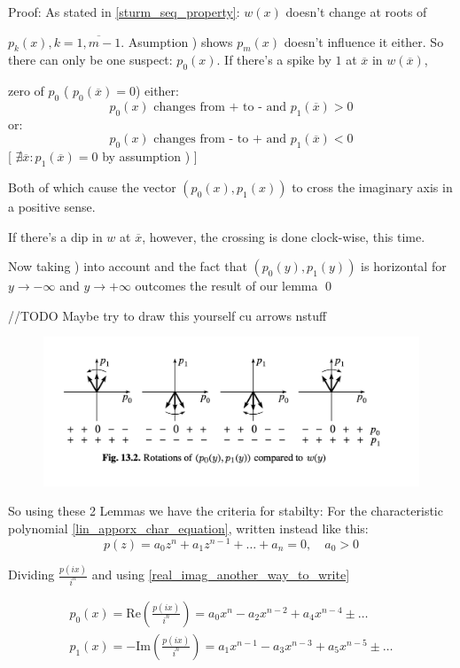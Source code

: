 Proof: As stated in \ref{sturm_seq_property}: $w(x)$ doesn't change at roots of

$p_k(x), k = \overline{1,m-1}$. Asumption ) shows $p_m(x)$
doesn't influence it either. So there can only be one suspect:
$p_0(x)$. If there's a spike by $1$ at $\overline{x}$ in $w(\overline{x})$,

zero of $p_0$
(   $p_0(\overline{x}) =0 $) either:
\[
p_0(x) \text{ changes from + to - and   } p_1(\overline{x}) > 0
\]
or:
\[
p_0(x) \text{ changes from - to + and  } p_1(\overline{x}) < 0
\]
[   $\nexists \overline{x}: p_1(\overline{x}) = 0$ by assumption )  ]

Both of which cause the vector $(p_0(x), p_1(x))$ to cross the
imaginary axis in a positive sense.

If there's a dip in $w$ at $\overline{x}$, however, the crossing is
done clock-wise, this time.

Now taking ) into account and the fact that $(p_0(y), p_1(y))$
is horizontal for $y \rightarrow  - \infty$ and $y \rightarrow +
\infty  $ outcomes the result of our lemma
\qed

//TODO Maybe try to draw this yourself cu arrows nstuff

\begin{figure}
\includegraphics[width=13cm]{math_pics/sageti-cumse-invart.png}
\centering
\end{figure}

So using these 2 Lemmas we have the criteria for stabilty:
For the characteristic polynomial \ref{lin_apporx_char_equation},
written instead like this:
\[
p(z)=a_0 z^n + a_1z^{n-1} + \dots + a_n = 0, \quad a_0 > 0
\]

Dividing $\frac{p(i x)}{i^n}$ and using \ref{real_imag_another_way_to_write}

\begin{gather}
p_0(x)= \text{Re}(\frac{p(i x)}{i^n}) = a_0 x^{n} -a_2 x^{n-2} + a_4
x^{n-4} \pm \dots \\
p_1(x)= -\text{Im} (\frac{p(i x)}{i^n}) = a_1 x^{n-1} -a_3 x^{n-3} +
a_5 x^{n-5} \pm \dots
\end{gather}


